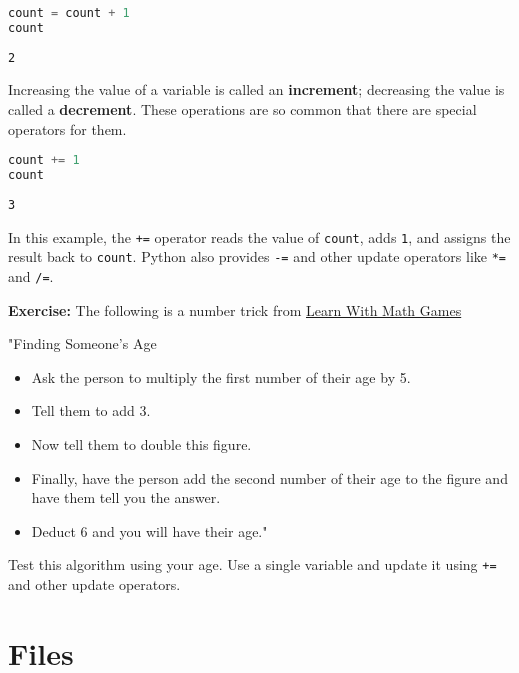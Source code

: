 \begin{lstlisting}[language=Python]
count = count + 1
count
\end{lstlisting}

\begin{lstlisting}[]
2
\end{lstlisting}

Increasing the value of a variable is called an \textbf{increment};
decreasing the value is called a \textbf{decrement}. These operations
are so common that there are special operators for them.

\begin{lstlisting}[language=Python]
count += 1
count
\end{lstlisting}

\begin{lstlisting}[]
3
\end{lstlisting}

In this example, the \passthrough{\lstinline!+=!} operator reads the
value of \passthrough{\lstinline!count!}, adds
\passthrough{\lstinline!1!}, and assigns the result back to
\passthrough{\lstinline!count!}. Python also provides
\passthrough{\lstinline!-=!} and other update operators like
\passthrough{\lstinline!*=!} and \passthrough{\lstinline!/=!}.

\textbf{Exercise:} The following is a number trick from
\href{https://www.learn-with-math-games.com/math-number-tricks.html}{Learn
With Math Games}

"Finding Someone's Age

\begin{itemize}
\item
  Ask the person to multiply the first number of their age by 5.
\item
  Tell them to add 3.
\item
  Now tell them to double this figure.
\item
  Finally, have the person add the second number of their age to the
  figure and have them tell you the answer.
\item
  Deduct 6 and you will have their age."
\end{itemize}

Test this algorithm using your age. Use a single variable and update it
using \passthrough{\lstinline!+=!} and other update operators.

\hypertarget{files}{%
\section{Files}\label{files}}


